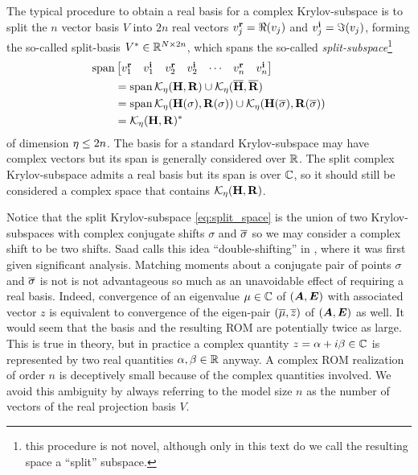    The typical procedure to obtain a real basis for a complex Krylov-subspace  is to split the $n$ vector basis $V$ into $2n$ real vectors  $v^{\mathrm{\bf{r}}}_{j} = \Re(v_j)$ and $v^{\mathrm{\bf{i}}}_{j} = \Im(v_j)$, forming the so-called split-basis $V^*\in\mathbb{R}^{N\times 2n}$, which  spans the so-called  \emph{split-subspace}\footnote{this procedure is not novel, although only in this text do we call the resulting space a ``split'' subspace.}
\begin{equation}
\begin{aligned}
\operatorname*{span}&\begin{bmatrix} v^{\mathrm{\bf{r}}}_{1} & v^{\mathrm{\bf{i}}}_{1} & v^{\mathrm{\bf{r}}}_{2} & v^{\mathrm{\bf{i}}}_{2} & \cdots &  v^{\mathrm{\bf{r}}}_{n} & v^{\mathrm{\bf{i}}}_{n} \end{bmatrix}\\ 
&= \operatorname*{span} \mathcal{K}_{\eta}({\textbf{\textup{H}}},{\textbf{\textup{R}}}) \cup  \mathcal{K}_{\eta}({\overline{\textbf{\textup{H}}}},{\overline{\textbf{\textup{R}}}})\\
&= \operatorname*{span} \mathcal{K}_{\eta}({\textbf{\textup{H}}(\sigma)},{\textbf{\textup{R}}(\sigma)}) \cup  \mathcal{K}_{\eta}({\textbf{\textup{H}}(\overline{\sigma})},{\textbf{\textup{R}}(\overline{\sigma})})\\
&= \mathcal{K}_{\eta}({\textbf{\textup{H}}},{\textbf{\textup{R}}})^*
\end{aligned}
\label{eq:split_space}
\end{equation}
of dimension $\eta \leq 2n$.
   The basis for a standard Krylov-subspace  may have complex vectors but its span is generally considered over $\mathbb{R}$.  The split complex Krylov-subspace  admits a real basis but its span is over $\mathbb{C}$, so it should still be considered a complex space that contains $\mathcal{K}_{\eta}({\textbf{\textup{H}}},{\textbf{\textup{R}}})$.

Notice that the split Krylov-subspace  \eqref{eq:split_space} is the union of two Krylov-subspaces  with complex conjugate shifts $\sigma$ and $\overline{\sigma}$ so we may consider a complex shift to be two shifts.  Saad calls this idea ``double-shifting'' in \cite{complex_strategies}, where it was first given significant analysis.  Matching moments about a conjugate pair of points $\sigma$ and $\overline{\sigma}$ is not is not advantageous so much as an unavoidable effect of requiring a real basis.   Indeed, convergence of an eigenvalue $\mu\in\mathbb{C}$ of $(\bm{A},\bm{E})$ with associated vector $z$ is equivalent to convergence of the eigen-pair $(\overline{\mu},\overline{z})$ of $(\bm{A},\bm{E})$ as well.  It would seem that the basis and the resulting ROM are potentially twice as large.   This is true in theory, but in practice a complex quantity $z = \alpha + i\beta \in \mathbb{C}$ is represented by two real quantities $\alpha, \beta\in \mathbb{R}$ anyway.   A complex ROM realization of order $n$ is deceptively small because of the complex quantities involved.  We avoid this ambiguity by always referring to the model size $n$ as the number of vectors of the real projection basis $V$.


